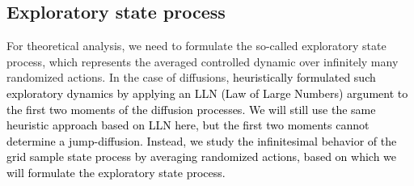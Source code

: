 \documentclass[11pt]{article}
\newcommand{\1}{\mathbbm{1}}
\newcommand{\bpi}{\boldsymbol{\pi}}
\newcommand{\rev}[1]{\textcolor{black}{{#1}}} %
\begin{document}






\subsection{Exploratory state process}
For theoretical analysis, we need to formulate the so-called exploratory state process, which represents the averaged controlled dynamic over infinitely many randomized actions. In the case of diffusions, \cite{wang2020reinforcement} \rev{heuristically formulated such exploratory dynamics by applying an LLN (Law of Large Numbers) argument to the first two moments of the diffusion processes. We will still use the same heuristic approach based on LLN here, but the first two moments cannot determine a jump-diffusion. Instead, we study the infinitesimal behavior of the grid sample state process by averaging randomized actions, based on which we will formulate the exploratory state process.}
\end{document}
